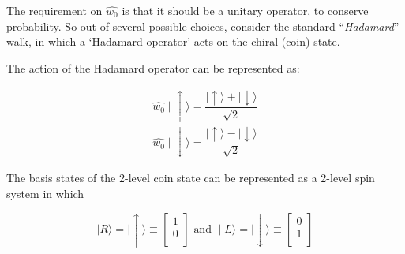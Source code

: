 \documentclass[english]{article}
\begin{document}
The requirement on $\hat{w_{0}}$ is that it should be a unitary operator, to conserve probability. So out of several possible choices, consider the standard ``\textit{Hadamard}'' walk, in which a `Hadamard operator' acts on the chiral (coin) state.


The action of the Hadamard operator can be represented as:

\begin{equation} \label{eq:hadamard-op}
\begin{aligned}
\hat{w_{0}}\mid\! \uparrow\rangle = \dfrac{\mid\! \uparrow\rangle + \mid\! \downarrow\rangle}{\sqrt{2}} \\
 \hat{w_{0}}\mid\! \downarrow\rangle = \dfrac{\mid\! \uparrow\rangle - \mid\! \downarrow\rangle}{\sqrt{2}}
\end{aligned}
\end{equation}


The basis states of the 2-level coin state can be represented as a 2-level spin system in which 

\begin{equation}\label{eq:spin-basis}
\mid\! R\rangle = \mid\! \uparrow\rangle \equiv \left[ \! \begin{array}{c}
1 \\
0\\
\end{array} \!\right] \mbox{               and               } 
\mid\! L\rangle = \mid\! \downarrow\rangle \equiv \left[ \! \begin{array}{c}
0 \\
1\\
\end{array} \!\right]
\end{equation}
\end{document}
